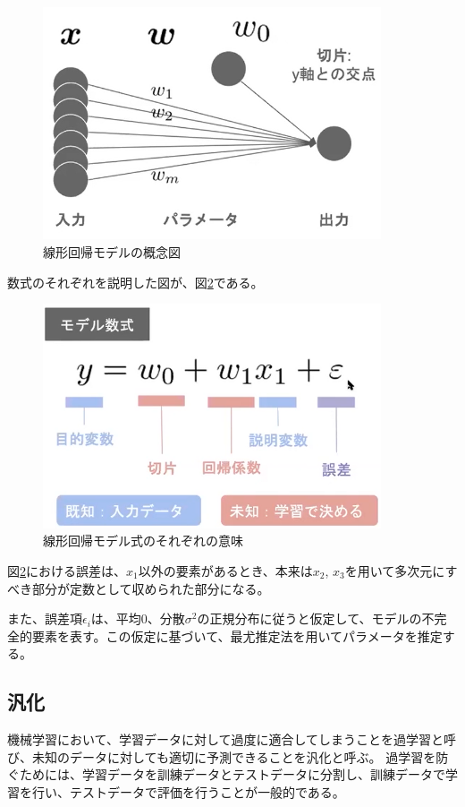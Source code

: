 \documentclass{ltjsarticle}
\begin{document}
\begin{figure}[htbp]
  \centering
  \includegraphics[width=10cm]{kaiki.png}
  \caption{線形回帰モデルの概念図}
  \label{fig:kaiki}
\end{figure}

数式のそれぞれを説明した図が、図\ref{fig:equation}である。
\begin{figure}[htbp]
  \centering
  \includegraphics[width=10cm]{equation.png}
  \caption{線形回帰モデル式のそれぞれの意味}
  \label{fig:equation}
\end{figure}
図\ref{fig:equation}における誤差は、$x_1$以外の要素があるとき、本来は$x_2$, $x_3$を用いて多次元にすべき部分が定数として収められた部分になる。

また、誤差項$\epsilon_i$は、平均0、分散$\sigma^2$の正規分布に従うと仮定して、モデルの不完全的要素を表す。この仮定に基づいて、最尤推定法を用いてパラメータを推定する。

\subsection{汎化}
機械学習において、学習データに対して過度に適合してしまうことを過学習と呼び、未知のデータに対しても適切に予測できることを汎化と呼ぶ。
過学習を防ぐためには、学習データを訓練データとテストデータに分割し、訓練データで学習を行い、テストデータで評価を行うことが一般的である。
\end{document}

